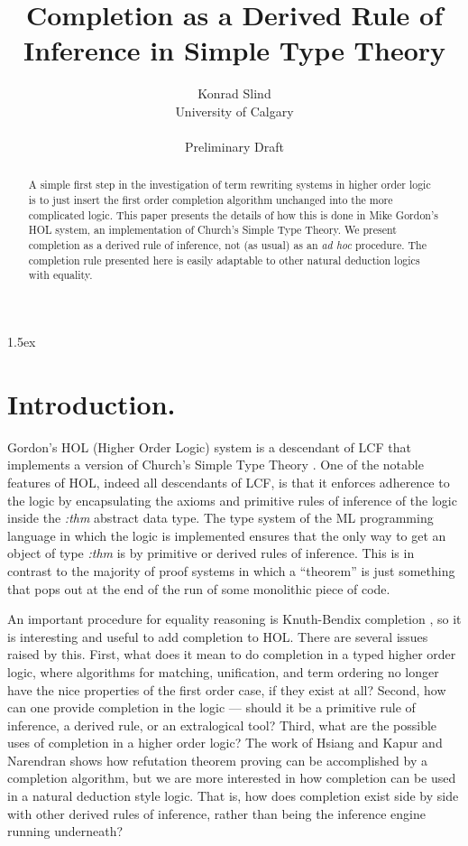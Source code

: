 
\title {Completion as a Derived Rule of Inference in Simple Type Theory}
\author{Konrad Slind \\
        University of Calgary \\
        \\
        Preliminary Draft}
\begin{abstract}
A simple first step in the investigation of term rewriting systems in higher
order logic is to just insert the first order completion algorithm unchanged
into the more complicated logic. This paper presents the details of how this is
done in Mike Gordon's HOL system, an implementation of Church's Simple Type
Theory. We present completion as a derived rule of inference, not (as usual) as
an {\em ad hoc} procedure. The completion rule presented here is easily
adaptable to other natural deduction logics with equality.
\end{abstract}
\maketitle
\raggedright
\setlength{\parindent}{0in}
\setlength{\parskip} {1.5ex}


\section*{Introduction.}

Gordon's HOL (Higher Order Logic) system \cite{gordon89} is a descendant of LCF
\cite{gmw79} that implements a version of Church's Simple Type Theory
\cite{church40}. One of the notable features of HOL, indeed all descendants of
LCF, is that it enforces adherence to the logic by encapsulating the axioms and
primitive rules of inference of the logic inside the {\em :thm} abstract data
type. The type system of the ML programming language in which the logic is
implemented ensures that the only way to get an object of type {\em :thm} is by
primitive or derived rules of inference. This is in contrast to the majority of
proof systems in which a ``theorem'' is just something that pops out at the end
of the run of some monolithic piece of code.

An important procedure for equality reasoning is Knuth-Bendix completion
\cite{kb70}, so it is interesting and useful to add completion to HOL. There
are several issues raised by this. First, what does it mean to do completion in
a typed higher order logic, where algorithms for matching, unification, and
term ordering no longer have the nice properties of the first order case, if
they exist at all? Second, how can one provide completion in the logic ---
should it be a primitive rule of inference, a derived rule, or an extralogical
tool? Third, what are the possible uses of completion in a higher order logic?
The work of Hsiang \cite{hsder83} and Kapur and Narendran \cite{kn84} shows how
refutation theorem proving can be accomplished by a completion algorithm, but
we are more interested in how completion can be used in a natural deduction
style logic. That is, how does completion exist side by side with other derived
rules of inference, rather than being the inference engine running underneath?

